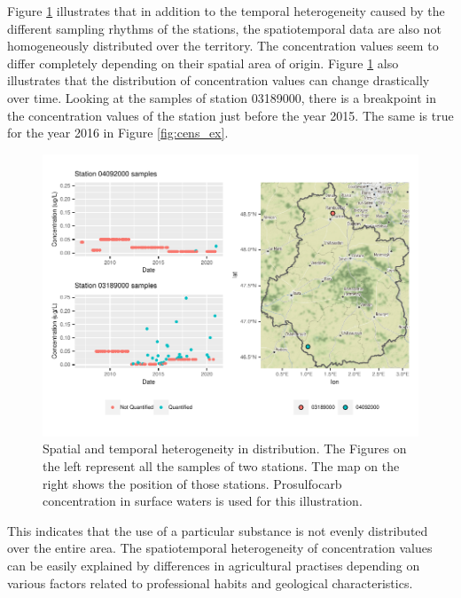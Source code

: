 Figure \ref{fig:het_spa_ex} illustrates that in addition to the temporal heterogeneity caused by the different sampling rhythms of the stations, the spatiotemporal data are also not homogeneously distributed over the territory. The concentration values seem to differ completely depending on their spatial area of origin. Figure \ref{fig:het_spa_ex} also illustrates that the distribution of concentration values can change drastically over time. Looking at the samples of station 03189000, there is a breakpoint in the concentration values of the station just before the year 2015. The same is true for the year 2016 in Figure \ref{fig:cens_ex}. 
\begin{figure}[htbp]
    \centering
    \includegraphics{figs/Chap3/Het_resC.pdf}
    \caption{Spatial and temporal heterogeneity in distribution. The Figures on the left represent all the samples of two stations. The map on the right shows the position of those stations. Prosulfocarb concentration in surface waters is used for this illustration.}
    \label{fig:het_spa_ex}
\end{figure}
This indicates that the use of a particular substance is not evenly distributed over the entire area. The spatiotemporal heterogeneity of concentration values can be easily explained by differences in agricultural practises depending on various factors related to professional habits and geological characteristics.


